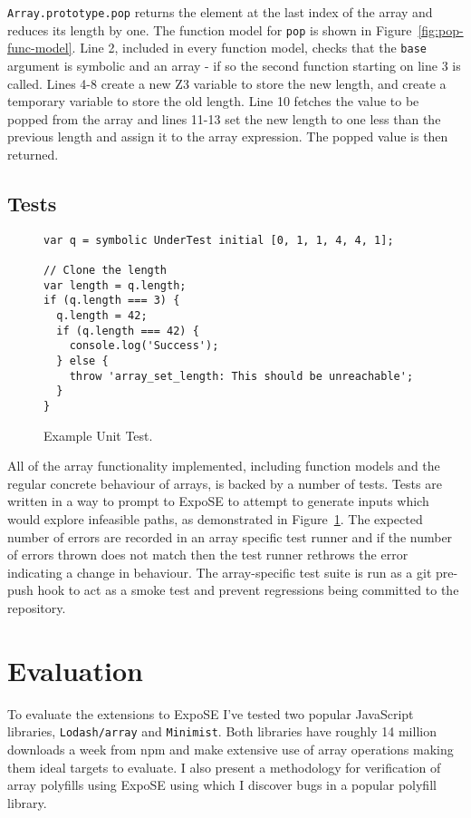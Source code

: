 \documentclass[]{final_report}
\begin{document}
\lstinline|Array.prototype.pop| returns the element at the last index of the array and reduces its length by one. The function model for \lstinline|pop| is shown in Figure~\ref{fig:pop-func-model}. Line 2, included in every function model, checks that the \lstinline|base| argument is symbolic and an array - if so the second function starting on line 3 is called. Lines 4-8 create a new Z3 variable to store the new length, and create a temporary variable to store the old length. Line 10 fetches the value to be popped from the array and lines 11-13 set the new length to one less than the previous length and assign it to the array expression. The popped value is then returned.


\subsection{Tests}
\begin{figure}[t]
\begin{lstlisting}
var q = symbolic UnderTest initial [0, 1, 1, 4, 4, 1];

// Clone the length
var length = q.length;
if (q.length === 3) {
  q.length = 42;
  if (q.length === 42) {
    console.log('Success');
  } else {
    throw 'array_set_length: This should be unreachable';
  }
}
\end{lstlisting}
\caption{\label{fig:example-length-test} Example Unit Test.}
\end{figure}

All of the array functionality implemented, including function models and the regular concrete behaviour of arrays, is backed by a number of tests. Tests are written in a way to prompt to ExpoSE to attempt to generate inputs which would explore infeasible paths, as demonstrated in Figure~\ref{fig:example-length-test}. The expected number of errors are recorded in an array specific test runner and if the number of errors thrown does not match then the test runner rethrows the error indicating a change in behaviour. The array-specific test suite is run as a git pre-push hook to act as a smoke test and prevent regressions being committed to the repository.

\section{Evaluation}
To evaluate the extensions to ExpoSE I've tested two popular JavaScript libraries, \lstinline|Lodash/array| and \lstinline|Minimist|. Both libraries have roughly 14 million downloads a week from npm and make extensive use of array operations making them ideal targets to evaluate. I also present a methodology for verification of array polyfills using ExpoSE using which I discover bugs in a popular polyfill library.
\end{document}
